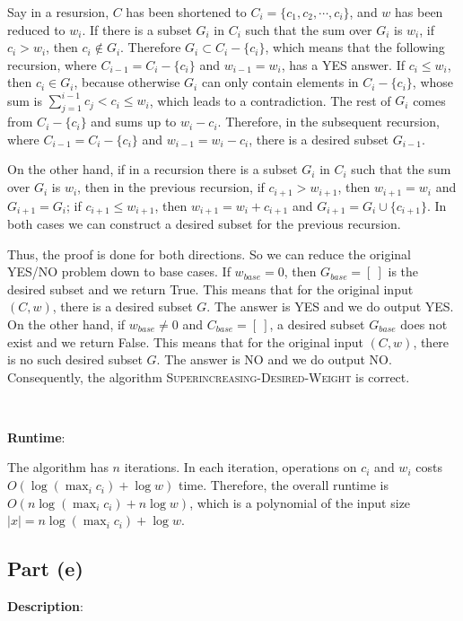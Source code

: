 \documentclass{article}
\begin{document}
Say in a resursion, $C$ has been shortened to $C_i=\{c_1,c_2,\cdots,c_i\}$, and $w$ has been reduced to $w_i$. If there is a subset $G_i$ in $C_i$ such that the sum over $G_i$ is $w_i$, if $c_i>w_i$, then $c_i\notin G_i$. Therefore $G_i\subset C_i-\{c_i\}$, which means that the following recursion, where $C_{i-1}=C_i-\{c_i\}$ and $w_{i-1}=w_i$, has a YES answer. If $c_i\leqslant w_i$, then $c_i\in G_i$, because otherwise $G_i$ can only contain elements in $C_i-\{c_i\}$, whose sum is $\sum_{j=1}^{i-1}c_j<c_i\leqslant w_i$, which leads to a contradiction. The rest of $G_i$ comes from $C_i-\{c_i\}$ and sums up to $w_i-c_i$. Therefore, in the subsequent recursion, where $C_{i-1}=C_i-\{c_i\}$ and $w_{i-1}=w_i-c_i$, there is a desired subset $G_{i-1}$.

On the other hand, if in a recursion there is a subset $G_i$ in $C_i$ such that the sum over $G_i$ is $w_i$, then in the previous recursion, if $c_{i+1}>w_{i+1}$, then $w_{i+1}=w_i$ and $G_{i+1}=G_i$; if $c_{i+1}\leqslant w_{i+1}$, then $w_{i+1}=w_i+c_{i+1}$ and $G_{i+1}=G_i\cup\{c_{i+1}\}$. In both cases we can construct a desired subset for the previous recursion.

Thus, the proof is done for both directions. So we can reduce the original YES/NO problem down to base cases. If $w_{base}=0$, then $G_{base}=[~]$ is the desired subset and we return True. This means that for the original input $(C,w)$, there is a desired subset $G$. The answer is YES and we do output YES. On the other hand, if $w_{base}\neq0$ and $C_{base}=[~]$, a desired subset $G_{base}$ does not exist and we return False. This means that for the original input $(C,w)$, there is no such desired subset $G$. The answer is NO and we do output NO. Consequently, the algorithm \textsc{Superincreasing-Desired-Weight} is correct.

~

\noindent\textbf{Runtime}:

The algorithm has $n$ iterations. In each iteration, operations on $c_i$ and $w_i$ costs $O(\log(\max_ic_i)+\log w)$ time. Therefore, the overall runtime is $O(n\log(\max_ic_i)+n\log w)$, which is a polynomial of the input size $|x|=n\log(\max_ic_i)+\log w$.

\subsection{Part (e)}
\noindent\textbf{Description}:
\end{document}
